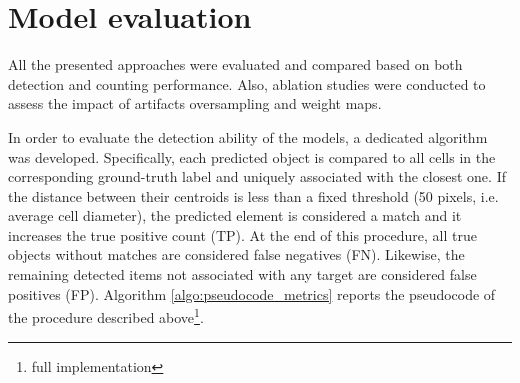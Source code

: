 \section{Model evaluation} \label{sec:model_evaluation}

All the presented approaches were evaluated and compared based on both detection and counting performance. 
Also, ablation studies were conducted to assess the impact of artifacts oversampling and weight maps.

In order to evaluate the detection ability of the models, a dedicated algorithm was developed.
Specifically, each predicted object is compared to all cells in the corresponding ground-truth label and uniquely associated with the closest one.
If the distance between their centroids is less than a fixed threshold (50 pixels, i.e. average cell diameter), the predicted element is considered a match and it increases the true positive count (TP).
At the end of this procedure, all true objects without matches are considered false negatives (FN). Likewise, the remaining detected items not associated with any target are considered false positives (FP).
Algorithm \ref{algo:pseudocode_metrics} reports the pseudocode of the procedure described above\footnote{full implementation \githubmetrics}.
